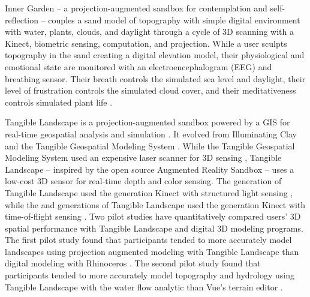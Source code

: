 \documentclass[prodmode,acmtochi]{acmsmall} %
\begin{document}
Inner Garden 
-- a projection-augmented sandbox 
for contemplation and self-reflection --
couples a sand model of topography with
simple digital environment with
water, plants, clouds, and daylight
through a cycle of 3D scanning with a Kinect, biometric sensing,
computation, and projection. 
%
While a user sculpts topography in the sand
creating a digital elevation model,
their physiological and emotional state are monitored with 
an electroencephalogram (EEG) and breathing sensor.
%
Their breath controls the simulated sea level and daylight,
their level of frustration controls the simulated cloud cover,
and their meditativeness controls simulated plant life
\cite{Roo2016}.

Tangible Landscape is a projection-augmented sandbox  
powered by a GIS for real-time geospatial analysis and simulation
\cite{Petrasova2015}. 
%
It evolved from 
Illuminating Clay \cite{Piper2002a} and 
the Tangible Geospatial Modeling System \cite{Tateosian2010}.
While the Tangible Geospatial Modeling System 
used an expensive laser scanner
for 3D sensing \cite{Tateosian2010}, 
Tangible Landscape 
-- inspired by
the open source Augmented Reality Sandbox \cite{Kreylos2012} --
uses a low-cost 3D sensor 
for real-time depth and color sensing. 
The  generation of Tangible Landscape \cite{Petrasova2014} 
used the  generation Kinect with structured light sensing \cite{Smisek2011}, 
while the   \cite{Petrasova2015} and  generations of Tangible Landscape 
used the  generation Kinect with time-of-flight sensing \cite{Bamji2015}. 
Two pilot studies have quantitatively 
compared users' 3D spatial performance 
with Tangible Landscape and digital 3D modeling programs.
%
The first pilot study found that participants tended to 
more accurately model landscapes using 
projection augmented modeling with Tangible Landscape
than digital modeling with Rhinoceros \cite{Harmon2016b}.
%
The second pilot study found that participants tended to 
more accurately model topography and hydrology
using Tangible Landscape with the water flow analytic
than Vue's terrain editor \cite{Harmon2016}. 
%


\end{document}
